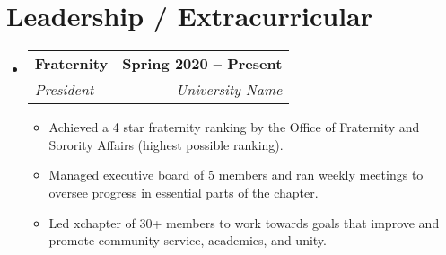 \documentclass[letterpaper,11pt]{ctexart}
\makeatletter
\newcommand{\resumeItem}[1]{
    \item\small{
            {#1 \vspace{-2pt}}
    }
}
\newcommand{\resumeSubheading}[4]{
    \vspace{-2pt}\item
    \begin{tabular*}{1.0\textwidth}[t]{l@{\extracolsep{\fill}}r}
        \textbf{#1} & \textbf{\small #2} \\
        \textit{\small#3} & \textit{\small #4} \\
    \end{tabular*}\vspace{-7pt}
}
\newcommand{\resumeSubHeadingListStart}{\begin{itemize}[leftmargin=0.0in, label={}]}
\newcommand{\resumeSubHeadingListEnd}{\end{itemize}}
\newcommand{\resumeItemListStart}{\begin{itemize}}
\newcommand{\resumeItemListEnd}{\end{itemize}\vspace{-5pt}}
\makeatother
\begin{document}
\section{Leadership / Extracurricular}
\resumeSubHeadingListStart
\resumeSubheading{Fraternity}{Spring 2020 -- Present}{President}{University Name}
\resumeItemListStart
\resumeItem{Achieved a 4 star fraternity ranking by the Office of Fraternity and Sorority Affairs (highest possible ranking).}
\resumeItem{Managed executive board of 5 members and ran weekly meetings to oversee progress in essential parts of the chapter.}
\resumeItem{Led xchapter of 30+ members to work towards goals that improve and promote community service, academics, and unity.}
\resumeItemListEnd

\resumeSubHeadingListEnd
\end{document}
